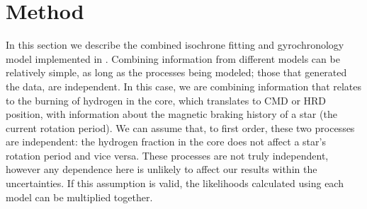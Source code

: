 \section{Method}
\label{section:method}

In this section we describe the combined isochrone fitting and gyrochronology
model implemented in \sd.
Combining information from different models can be relatively simple, as long
as the processes being modeled; those that generated the data, are
independent.
In this case, we are combining information that relates to the burning of
hydrogen in the core, which translates to CMD or HRD position,
with information about the magnetic braking history of a star (the current
rotation period).
We can assume that, to first order, these two processes are independent: the
hydrogen fraction in the core does not affect a star's rotation period and
vice versa.
These processes are not truly independent, however any dependence here is
unlikely to affect our results within the uncertainties.
If this assumption is valid, the likelihoods calculated using each model can
be multiplied together.

